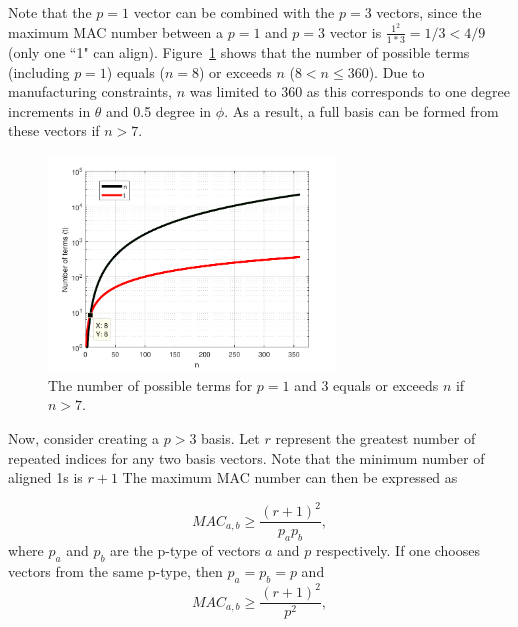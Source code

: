\documentclass[3p,times]{elsarticle}
\begin{document}
Note that the $p=1$ vector can be combined with the $p=3$ vectors, since the maximum MAC number between a $p=1$ and $p=3$ vector is $\frac{1^2}{1*3}=1/3 < 4/9$ (only one ``1" can align).  
Figure~\ref{fig:terms} shows that the number of possible terms (including $p=1$) equals ($n=8$) or exceeds $n$ ($8<n\le 360$).  
Due to manufacturing constraints, $n$ was limited to 360 as this corresponds to one degree increments in $\theta$ and 0.5 degree in $\phi$.  
As a result, a full basis can be formed from these vectors if $n>7$.

\begin{figure}[ht!]
\includegraphics[width={3.0in}]{../figs/TermPlot.pdf}
\centering
\caption{The number of possible terms for $p=1$ and 3 equals or exceeds $n$ if $n>7$.}
\label{fig:terms}
\end{figure}

Now, consider creating a $p>3$ basis.  
Let $r$ represent the greatest number of repeated indices for any two basis vectors.
Note that the minimum number of aligned 1s is $r+1$
The maximum MAC number can then be expressed as

\begin{equation}
MAC_{a,b}\ge\frac{\left(r+1\right)^2}{p_a p_b},
\end{equation}
where $p_a$ and $p_b$ are the p-type of vectors $a$ and $p$ respectively.  If one chooses vectors from the same p-type, then $p_a=p_b=p$ and
\begin{equation}
MAC_{a,b}\ge\frac{\left(r+1\right)^2}{p^2},
\end{equation}
\end{document}

